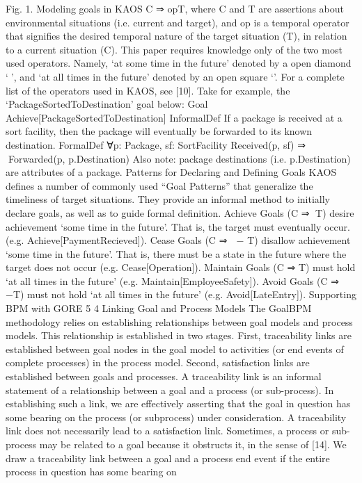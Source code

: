 Fig. 1. Modeling goals in KAOS
C ⇒ opT,
where C and T are assertions about environmental situations (i.e. current
and target), and op is a temporal operator that signifies the desired temporal
nature of the target situation (T), in relation to a current situation (C). This
paper requires knowledge only of the two most used operators. Namely, ‘at some
time in the future’ denoted by a open diamond ‘’, and ‘at all times in the
future’ denoted by an open square ‘’. For a complete list of the operators used
in KAOS, see [10].
Take for example, the ‘PackageSortedToDestination’ goal below:
Goal Achieve[PackageSortedToDestination]
InformalDef If a package is received at a sort facility, then the package
will eventually be forwarded to its known destination.
FormalDef ∀p: Package, sf: SortFacility
Received(p, sf) ⇒ Forwarded(p, p.Destination)
Also note: package destinations (i.e. p.Destination) are attributes of a package.
Patterns for Declaring and Defining Goals KAOS defines a number of commonly used “Goal Patterns” that generalize the timeliness of target situations.
They provide an informal method to initially declare goals, as well as to guide formal definition. Achieve Goals (C ⇒ T) desire achievement ‘some time in the future’. That is, the target must eventually occur. (e.g. Achieve[PaymentRecieved]).
Cease Goals (C ⇒  − T) disallow achievement ‘some time in the future’. That
is, there must be a state in the future where the target does not occur (e.g.
Cease[Operation]). Maintain Goals (C ⇒ T) must hold ‘at all times in the future’ (e.g. Maintain[EmployeeSafety]). Avoid Goals (C ⇒ −T) must not hold
‘at all times in the future’ (e.g. Avoid[LateEntry]).
Supporting BPM with GORE 5
4 Linking Goal and Process Models
The GoalBPM methodology relies on establishing relationships between goal
models and process models. This relationship is established in two stages. First,
traceability links are established between goal nodes in the goal model to activities (or end events of complete processes) in the process model. Second,
satisfaction links are established between goals and processes.
A traceability link is an informal statement of a relationship between a goal
and a process (or sub-process). In establishing such a link, we are effectively
asserting that the goal in question has some bearing on the process (or subprocess) under consideration. A traceability link does not necessarily lead to a
satisfaction link. Sometimes, a process or sub-process may be related to a goal
because it obstructs it, in the sense of [14]. We draw a traceability link between a
goal and a process end event if the entire process in question has some bearing on
